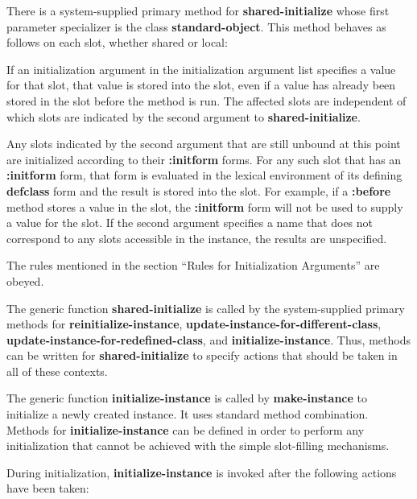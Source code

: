 There is a system-supplied primary method for {\bf
shared-initialize} whose first parameter specializer is the class {\bf
standard-object}.  This method behaves as follows on each slot,
whether shared or local:

\beginlist

\item{\bull} If an initialization argument in the initialization
argument list specifies a value for that slot, that value is stored
into the slot, even if a value has already been stored in the slot
before the method is run.  The affected slots are independent of which
slots are indicated by the second argument to {\bf shared-initialize}.

\item{\bull} Any slots indicated by the second argument that are still
unbound at this point are initialized according to their {\bf
:initform} forms.  For any such slot that has an {\bf :initform} form,
that form is evaluated in the lexical environment of its defining {\bf
defclass} form and the result is stored into the slot.  For example,
if a {\bf :before} method stores a value in the slot, the {\bf
:initform} form will not be used to supply a value for the slot.  If
the second argument specifies a name that does not correspond to any
slots accessible in the instance, the results are unspecified.

\item{\bull} The rules mentioned in the section ``Rules for
Initialization Arguments'' are obeyed.

\endlist

The generic function {\bf shared-initialize} is called by the
system-supplied primary methods for {\bf reinitialize-instance}, {\bf
update-instance-for-different-class}, {\bf
update-instance-for-redefined-class}, and {\bf
initialize-instance}.  Thus, methods can be written for {\bf
shared-initialize} to specify actions that should be taken in all of
these contexts.

\endsubSection%


The generic function {\bf initialize-instance} is called by {\bf
make-instance} to initialize a newly created instance.  It uses
standard method combination.  Methods for {\bf
initialize-instance} can be defined in order to perform any
initialization that cannot be achieved with the simple slot-filling
mechanisms.

During initialization, {\bf initialize-instance} is invoked
after the following actions have been taken:


